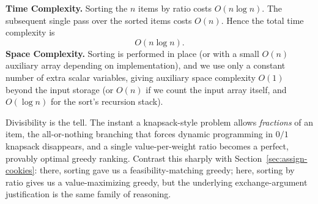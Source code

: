 \begin{complexitybox}
\textbf{Time Complexity.} Sorting the $n$ items by ratio costs
$O(n \log n)$. The subsequent single pass over the sorted items costs
$O(n)$. Hence the total time complexity is
\[
  O(n \log n).
\]
\textbf{Space Complexity.} Sorting is performed in place (or with a small
$O(n)$ auxiliary array depending on implementation), and we use only a
constant number of extra scalar variables, giving auxiliary space
complexity $O(1)$ beyond the input storage (or $O(n)$ if we count the
input array itself, and $O(\log n)$ for the sort's recursion stack).
\end{complexitybox}

\begin{takeawaybox}
Divisibility is the tell. The instant a knapsack-style problem allows
\emph{fractions} of an item, the all-or-nothing branching that forces
dynamic programming in $0/1$ knapsack disappears, and a single
value-per-weight ratio becomes a perfect, provably optimal greedy ranking.
Contrast this sharply with Section~\ref{sec:assign-cookies}: there, sorting
gave us a feasibility-matching greedy; here, sorting by ratio gives us a
value-maximizing greedy, but the underlying exchange-argument justification
is the same family of reasoning.
\end{takeawaybox}
